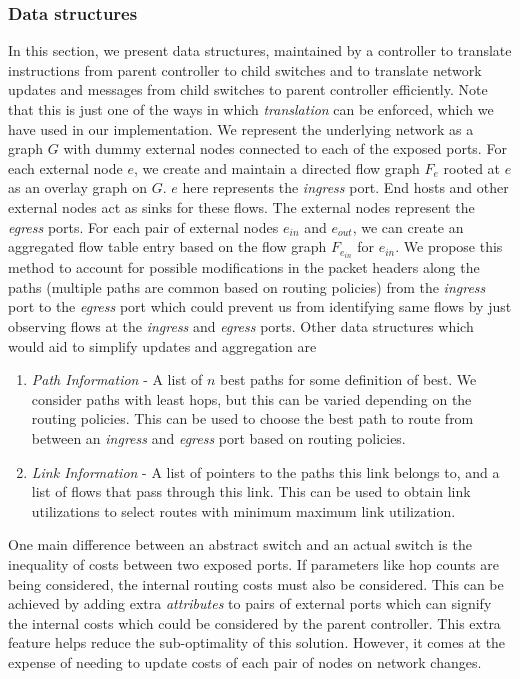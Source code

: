 \documentclass[10pt, twocolumn]{article}
\begin{document}
\subsubsection{Data structures}
\label{subsubsec:aggr-data}
In this section, we present data structures, maintained by a controller to translate instructions from parent controller to child switches and to translate network updates and messages from child switches to parent controller efficiently. Note that this is just one of the ways in which \emph{translation} can be enforced, which we have used in our implementation. We represent the underlying network as a graph $G$ with dummy external nodes connected to each of the exposed ports. For each external node $e$, we create and maintain a directed flow graph $F_e$ rooted at $e$ as an overlay graph on $G$. $e$ here represents the \emph{ingress} port. End hosts and other external nodes act as sinks for these flows. The external nodes represent the \emph{egress} ports.
For each pair of external nodes $e_{in}$ and $e_{out}$, we can create an aggregated flow table entry based on the flow graph $F_{e_{in}}$ for $e_{in}$. We propose this method to account for possible modifications in the packet headers along the paths (multiple paths are common based on routing policies) from the \emph{ingress} port to the \emph{egress} port which could prevent us from identifying same flows by just observing flows at the \emph{ingress} and \emph{egress} ports.
Other data structures which would aid to simplify updates and aggregation are
\begin{enumerate}
    \item \emph{Path Information} - A list of $n$ best paths for some definition of best. We consider paths with least hops, but this can be varied depending on the routing policies. This can be used to choose the best path to route from between an \emph{ingress} and \emph{egress} port based on routing policies.
    \item \emph{Link Information} - A list of pointers to the paths this link belongs to, and a list of flows that pass through this link. This can be used to obtain link utilizations to select routes with minimum maximum link utilization.
\end{enumerate}
One main difference between an abstract switch and an actual switch is the inequality of costs between two exposed ports. If parameters like hop counts are being considered, the internal routing costs must also be considered. This can be achieved by adding extra \emph{attributes} to pairs of external ports which can signify the internal costs which could be considered by the parent controller. This extra feature helps reduce the sub-optimality of this solution. However, it comes at the expense of needing to update costs of each pair of nodes on network changes.
\end{document}
